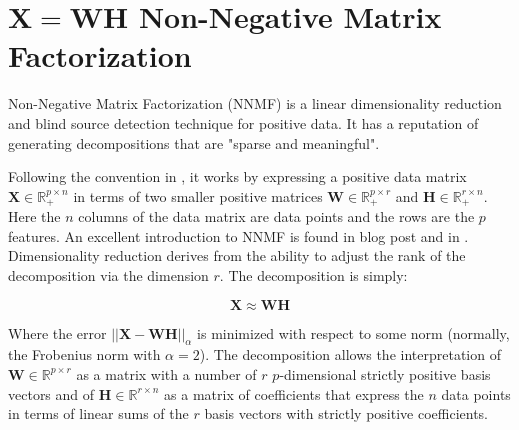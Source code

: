 \section{$\mathbf{X}=\mathbf{W}\mathbf{H}$ Non-Negative Matrix Factorization}

Non-Negative Matrix Factorization (NNMF) is a linear dimensionality reduction and blind source detection technique for positive data. It has a reputation of generating decompositions that are "sparse and meaningful". 

Following the convention in , it works by expressing a positive data matrix $\mathbf{X}\in\mathbb{R}^{p\times n}_+$ in terms of two smaller positive matrices $\mathbf{W}\in\mathbb{R}_+^{p\times r}$ and $\mathbf{H}\in \mathbb{R}^{r\times n}_+$. Here the $n$ columns of the data matrix are data points and the rows are the $p$ features. An excellent introduction to NNMF is found in  blog post and in . Dimensionality reduction derives from the ability to adjust the rank of the decomposition via the dimension $r$. The decomposition is simply:

\begin{equation}
\mathbf{X} \approx \mathbf{WH}
\end{equation}

Where the error $||\mathbf{X} - \mathbf{WH}||_\alpha$ is minimized with respect to some norm (normally, the Frobenius norm with $\alpha=2$). The decomposition allows the interpretation of $\mathbf{W} \in \mathbb{R}^{p\times r}$ as a matrix with a number of $r$ $p$-dimensional strictly positive basis vectors and of $\mathbf{H} \in \mathbb{R}^{r\times n}$ as a matrix of coefficients that express the $n$ data points in terms of linear sums of the $r$ basis vectors with strictly positive coefficients. 

